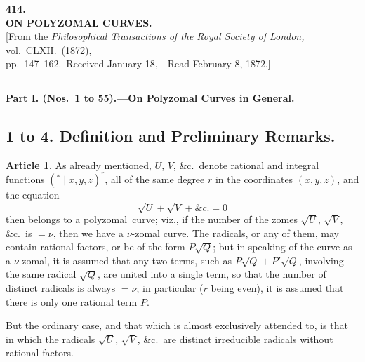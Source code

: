 \documentclass[11pt,a4paper]{article}
\theoremstyle{definition}
\newtheorem{art}{Article}
\newcommand{\polyzomal}{polyzomal}
\begin{document}
\thispagestyle{empty}
\begin{center}
{\Large\bfseries 414.}\\[1em]
{\LARGE\bfseries ON POLYZOMAL CURVES.}\\[2em]
{\normalsize [From the \textit{Philosophical Transactions of the Royal Society of London,} vol.\ CLXII.\ (1872),\\pp.~147--162.\ Received January 18,---Read February 8, 1872.]}\\[2em]
\rule{0.5\textwidth}{0.4pt}
\end{center}

\vspace{1em}

\begin{center}
\textbf{Part I. (Nos.\ 1 to 55).---On Polyzomal Curves in General.}
\end{center}

\vspace{0.5em}

\subsection{1 to 4. Definition and Preliminary Remarks.}

\begin{art}
As already mentioned, $U$, $V$, \&c.\ denote rational and integral functions $({}^{*}\!\!\mid\! x, y, z)^{r}$, all of the same degree $r$ in the coordinates $(x, y, z)$, and the equation
\[
\sqrt{U} + \sqrt{V} + \&c. = 0
\]
then belongs to a \polyzomal\ curve; viz., if the number of the zomes $\sqrt{U}$, $\sqrt{V}$, \&c.\ is $= \nu$, then we have a $\nu$-zomal curve. The radicals, or any of them, may contain rational factors, or be of the form $P\sqrt{Q}$; but in speaking of the curve as a $\nu$-zomal, it is assumed that any two terms, such as $P\sqrt{Q} + P'\sqrt{Q}$, involving the same radical $\sqrt{Q}$, are united into a single term, so that the number of distinct radicals is always $= \nu$; in particular ($r$ being even), it is assumed that there is only one rational term $P$.

But the ordinary case, and that which is almost exclusively attended to, is that in which the radicals $\sqrt{U}$, $\sqrt{V}$, \&c.\ are distinct irreducible radicals without rational factors.
\end{art}
\end{document}

